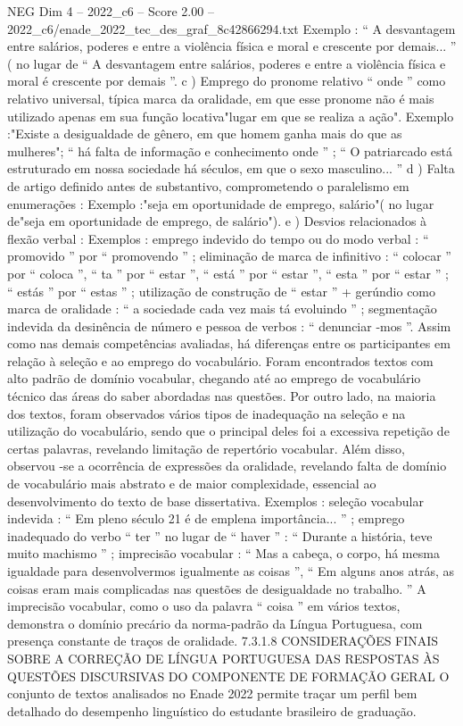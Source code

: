 \begin{textsample}{NEG Dim 4 – 2022\_c6 – Score 2.00 – 2022\_c6/enade\_2022\_tec\_des\_graf\_8c42866294.txt}
Exemplo : “ A desvantagem entre salários, poderes e entre a violência física e moral e crescente por demais... ” ( no lugar de “ A desvantagem entre salários, poderes e entre a violência física e moral é crescente por demais ”. c ) Emprego do pronome relativo “ onde ” como relativo universal, típica marca da oralidade, em que esse pronome não é mais utilizado apenas em sua função locativa"lugar em que se realiza a ação".
Exemplo :"Existe a desigualdade de gênero, em que homem ganha mais do que as mulheres"; “ há falta de informação e conhecimento onde ” ; “ O patriarcado está estruturado em nossa sociedade há séculos, em que o sexo masculino... ” d ) Falta de artigo definido antes de substantivo, comprometendo o paralelismo em enumerações : Exemplo :"seja em oportunidade de emprego, salário"( no lugar de"seja em oportunidade de emprego, de salário"). e ) Desvios relacionados à flexão verbal : Exemplos : emprego indevido do tempo ou do modo verbal : “ promovido ” por “ promovendo ” ; eliminação de marca de infinitivo : “ colocar ” por “ coloca ”, “ ta ” por “ estar ”, “ está ” por “ estar ”, “ esta ” por “ estar ” ; “ estás ” por “ estas ” ; utilização de construção de “ estar ” + gerúndio como marca de oralidade : “ a sociedade cada vez mais tá evoluindo ” ; segmentação indevida da desinência de número e pessoa de verbos : “ denunciar -mos ”.
Assim como nas demais competências avaliadas, há diferenças entre os participantes em relação à seleção e ao emprego do vocabulário.
Foram encontrados textos com alto padrão de domínio vocabular, chegando até ao emprego de vocabulário técnico das áreas do saber abordadas nas questões.
Por outro lado, na maioria dos textos, foram observados vários tipos de inadequação na seleção e na utilização do vocabulário, sendo que o principal deles foi a excessiva repetição de certas palavras, revelando limitação de repertório vocabular.
Além disso, observou -se a ocorrência de expressões da oralidade, revelando falta de domínio de vocabulário mais abstrato e de maior complexidade, essencial ao desenvolvimento do texto de base dissertativa.
Exemplos : seleção vocabular indevida : “ Em pleno século 21 é de emplena importância... ” ; emprego inadequado do verbo “ ter ” no lugar de “ haver ” : “ Durante a história, teve muito machismo ” ; imprecisão vocabular : “ Mas a cabeça, o corpo, há mesma igualdade para desenvolvermos igualmente as coisas ”, “ Em alguns anos atrás, as coisas eram mais complicadas nas questões de desigualdade no trabalho. ” A imprecisão vocabular, como o uso da palavra “ coisa ” em vários textos, demonstra o domínio precário da norma-padrão da Língua Portuguesa, com presença constante de traços de oralidade. 7.3.1.8 CONSIDERAÇÕES FINAIS SOBRE A CORREÇÃO DE LÍNGUA PORTUGUESA DAS RESPOSTAS ÀS QUESTÕES DISCURSIVAS DO COMPONENTE DE FORMAÇÃO GERAL O conjunto de textos analisados no Enade 2022 permite traçar um perfil bem detalhado do desempenho linguístico do estudante brasileiro de graduação.

\end{textsample}
